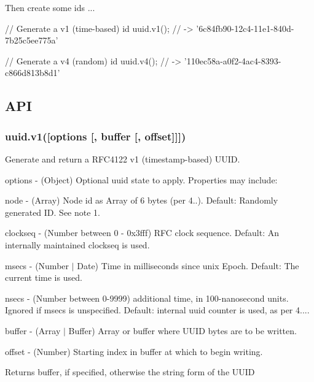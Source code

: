 Then create some ids ...


\begin{DoxyCode}
// Generate a v1 (time-based) id
uuid.v1(); // -> '6c84fb90-12c4-11e1-840d-7b25c5ee775a'

// Generate a v4 (random) id
uuid.v4(); // -> '110ec58a-a0f2-4ac4-8393-c866d813b8d1'
\end{DoxyCode}


\subsection*{A\+PI}

\subsubsection*{uuid.\+v1(\mbox{[}{\ttfamily options} \mbox{[}, {\ttfamily buffer} \mbox{[}, {\ttfamily offset}\mbox{]}\mbox{]}\mbox{]})}

Generate and return a R\+F\+C4122 v1 (timestamp-\/based) U\+U\+ID.


\begin{DoxyItemize}
\item {\ttfamily options} -\/ (Object) Optional uuid state to apply. Properties may include\+:
\begin{DoxyItemize}
\item {\ttfamily node} -\/ (Array) Node id as Array of 6 bytes (per 4..). Default\+: Randomly generated ID. See note 1.
\item {\ttfamily clockseq} -\/ (Number between 0 -\/ 0x3fff) R\+FC clock sequence. Default\+: An internally maintained clockseq is used.
\item {\ttfamily msecs} -\/ (Number $\vert$ Date) Time in milliseconds since unix Epoch. Default\+: The current time is used.
\item {\ttfamily nsecs} -\/ (Number between 0-\/9999) additional time, in 100-\/nanosecond units. Ignored if {\ttfamily msecs} is unspecified. Default\+: internal uuid counter is used, as per 4....
\end{DoxyItemize}
\item {\ttfamily buffer} -\/ (Array $\vert$ Buffer) Array or buffer where U\+U\+ID bytes are to be written.
\item {\ttfamily offset} -\/ (Number) Starting index in {\ttfamily buffer} at which to begin writing.
\end{DoxyItemize}

Returns {\ttfamily buffer}, if specified, otherwise the string form of the U\+U\+ID

